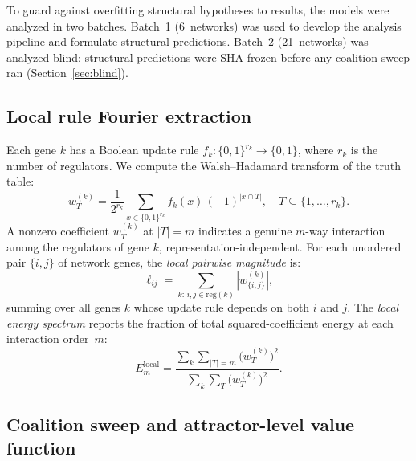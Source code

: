 \documentclass[11pt]{article}
\begin{document}
To guard against overfitting structural hypotheses to results, the
models were analyzed in two batches. Batch~1 (6~networks) was used to
develop the analysis pipeline and formulate structural predictions.
Batch~2 (21~networks) was analyzed blind: structural predictions were
SHA-frozen before any coalition sweep ran
(Section~\ref{sec:blind}).


\subsection{Local rule Fourier extraction}
\label{sec:local-fourier}

Each gene $k$ has a Boolean update rule $f_k\colon \{0,1\}^{r_k}
\to \{0,1\}$, where $r_k$ is the number of regulators. We compute
the Walsh--Hadamard transform of the truth table:
%
\begin{equation}
\label{eq:local-wht}
w_T^{(k)} = \frac{1}{2^{r_k}} \sum_{x \in \{0,1\}^{r_k}} f_k(x)\,(-1)^{|x \cap T|},
\quad T \subseteq \{1, \ldots, r_k\}.
\end{equation}
%
A nonzero coefficient $w_T^{(k)}$ at $|T| = m$ indicates a genuine
$m$-way interaction among the regulators of gene $k$,
representation-independent. For each unordered pair $\{i,j\}$ of
network genes, the \emph{local pairwise magnitude} is:
%
\begin{equation}
\label{eq:local-pair}
\ell_{ij} = \sum_{k:\, i,j \in \mathrm{reg}(k)} |w_{\{i,j\}}^{(k)}|,
\end{equation}
%
summing over all genes $k$ whose update rule depends on both $i$ and
$j$. The \emph{local energy spectrum} reports the fraction of total
squared-coefficient energy at each interaction order~$m$:
%
\begin{equation}
\label{eq:local-spectrum}
E_m^{\mathrm{local}} = \frac{\sum_k \sum_{|T|=m} \bigl(w_T^{(k)}\bigr)^2}
{\sum_k \sum_T \bigl(w_T^{(k)}\bigr)^2}.
\end{equation}


\subsection{Coalition sweep and attractor-level value function}
\label{sec:coalition-sweep}
\end{document}
